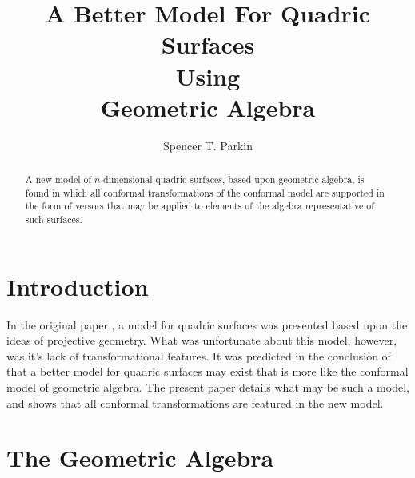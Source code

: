 \documentclass{birkjour}
\theoremstyle{definition}
\theoremstyle{remark}
\numberwithin{equation}{section}
\begin{document}
\title{A Better Model For Quadric Surfaces\\Using\\Geometric Algebra}

\author{Spencer T. Parkin}
\address{%
2113 S. Claremont Dr.\\
Bountiful, Utah  84010\\
USA}





\begin{abstract}
A new model of $n$-dimensional quadric surfaces, based upon geometric algebra, is
found in which all conformal transformations of the conformal model are supported in the form of versors that
may be applied to elements of the algebra representative of such surfaces.
\end{abstract}

\maketitle

\section{Introduction}

In the original paper \cite{Parkin12}, a model for quadric surfaces was
presented based upon the ideas of projective geometry.  What was unfortunate
about this model, however, was it's lack of transformational features.  It was
predicted in the conclusion of \cite{Parkin12} that a better model for quadric
surfaces may exist that is more like the conformal model of geometric algebra.
The present paper details what may be such a model, and shows that all conformal
transformations are featured in the new model.

\section{The Geometric Algebra}
\end{document}

